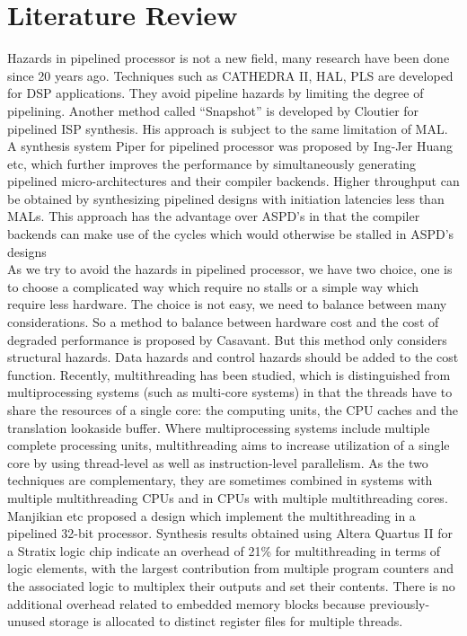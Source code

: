 \documentclass[12pt,a4paper]{report}
\begin{document}
\section{Literature Review}
Hazards in pipelined processor is not a new field, many research have been done since 20 years ago. Techniques such as CATHEDRA II\cite{59069}, HAL\cite{31522}, PLS\cite{979815} are developed for DSP applications. They avoid pipeline hazards by limiting the degree of pipelining. Another method called ``Snapshot'' is developed by Cloutier for pipelined ISP synthesis\cite{Cloutier:1993:SPI:157485.165053}. His approach is subject to the same limitation of MAL.
A synthesis system Piper for pipelined processor was proposed by Ing-Jer Huang etc\cite{227847},  which further improves the performance by simultaneously generating pipelined micro-architectures and their compiler backends. Higher throughput can be obtained by synthesizing pipelined designs with initiation latencies less than MALs. This approach has the advantage over ASPD's in that the compiler backends can make use of the cycles which would otherwise be stalled in ASPD's designs \\
As we try to avoid the hazards in pipelined processor, we have two choice, one is to choose a complicated way which require no stalls or a simple way which require less hardware. The choice is not easy, we need to balance between many considerations. So a method to balance between hardware cost and the cost of degraded performance is proposed by Casavant\cite{470344}. But this method only considers structural hazards. Data hazards and control hazards should be added to the cost function.
Recently, multithreading has been studied, which is distinguished from multiprocessing systems (such as multi-core systems) in that the threads have to share the resources of a single core: the computing units, the CPU caches and the translation lookaside buffer. Where multiprocessing systems include multiple complete processing units, multithreading aims to increase utilization of a single core by using thread-level as well as instruction-level parallelism. As the two techniques are complementary, they are sometimes combined in systems with multiple multithreading CPUs and in CPUs with multiple multithreading cores.\\
Manjikian etc proposed a design which implement the multithreading in a pipelined 32-bit processor\cite{4016949}. Synthesis results obtained using Altera Quartus II for a Stratix logic chip indicate an overhead of 21\% for multithreading in terms of logic elements, with the largest contribution from multiple program counters and the associated logic to multiplex their outputs and set their contents. There is no additional overhead related to embedded memory blocks because previously-unused storage is allocated to distinct register files for multiple threads. 
\nocite{*}

\end{document}
